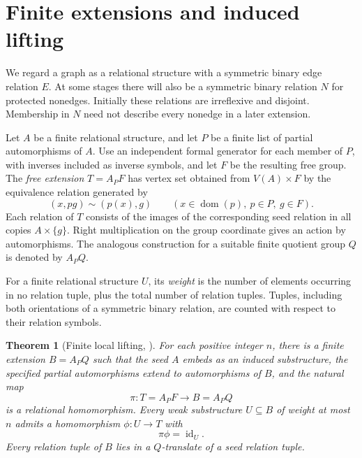 \documentclass[11pt,reqno]{amsart}
\newtheorem{theorem}{Theorem}[section]
\theoremstyle{definition}
\theoremstyle{remark}
\newcommand{\id}{\operatorname{id}}
\newcommand{\dom}{\operatorname{dom}}
\begin{document}
\section{Finite extensions and induced lifting}\label{sec:finite}

We regard a graph as a relational structure with a symmetric binary edge relation $E$. At some stages there will also be a symmetric binary relation $N$ for protected nonedges. Initially these relations are irreflexive and disjoint. Membership in $N$ need not describe every nonedge in a later extension.

Let $A$ be a finite relational structure, and let $P$ be a finite list of partial automorphisms of $A$. Use an independent formal generator for each member of $P$, with inverses included as inverse symbols, and let $F$ be the resulting free group. The \emph{free extension} $T=A_PF$ has vertex set obtained from $V(A)\times F$ by the equivalence relation generated by
\begin{equation}\label{eq:free-identification}
 (x,pg)\sim(p(x),g)\qquad(x\in\dom(p),\ p\in P,\ g\in F).
\end{equation}
Each relation of $T$ consists of the images of the corresponding seed relation in all copies $A\times\{g\}$. Right multiplication on the group coordinate gives an action by automorphisms. The analogous construction for a suitable finite quotient group $Q$ is denoted by $A_PQ$.

For a finite relational structure $U$, its \emph{weight} is the number of elements occurring in no relation tuple, plus the total number of relation tuples. Tuples, including both orientations of a symmetric binary relation, are counted with respect to their relation symbols.

\begin{theorem}[Finite local lifting, {\cite[Theorem~4.19]{ABO}}]\label{thm:lifting}
For each positive integer $n$, there is a finite extension $B=A_PQ$ such that the seed $A$ embeds as an induced substructure, the specified partial automorphisms extend to automorphisms of $B$, and the natural map
\[
 \pi:T=A_PF\longrightarrow B=A_PQ
\]
is a relational homomorphism. Every weak substructure $U\subseteq B$ of weight at most $n$ admits a homomorphism $\phi:U\to T$ with
\begin{equation}\label{eq:right-inverse}
 \pi\phi=\id_U.
\end{equation}
Every relation tuple of $B$ lies in a $Q$-translate of a seed relation tuple.
\end{theorem}
\end{document}
